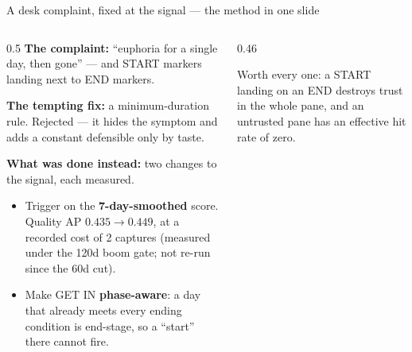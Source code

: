 \documentclass[aspectratio=169,11pt]{beamer}
\begin{document}
\begin{frame}{A desk complaint, fixed at the signal --- the method in one slide}
  \begin{columns}[T]
    \begin{column}{0.5\linewidth}
      \footnotesize
      \textbf{The complaint:} ``euphoria for a single day, then gone'' --- and
      START markers landing next to END markers.
      \vspace{0.3em}

      \textbf{The tempting fix:} a minimum-duration rule. Rejected --- it hides
      the symptom and adds a constant defensible only by taste.
      \vspace{0.3em}

      \textbf{What was done instead:} two changes to the signal, each measured.
      \begin{itemize}\scriptsize
        \item Trigger on the \textbf{7-day-smoothed} score. Quality
          AP $0.435 \rightarrow 0.449$, at a recorded cost of 2 captures
          (measured under the 120d boom gate; not re-run since the 60d cut).
        \item Make GET IN \textbf{phase-aware}: a day that already meets every
          ending condition is end-stage, so a ``start'' there cannot fire.
      \end{itemize}
    \end{column}
    \begin{column}{0.46\linewidth}
      \\[0.7em]
      \vspace{0.2em}

      {\scriptsize\color{gicgrey} Worth every one: a START landing on an END
       destroys trust in the whole pane, and an untrusted pane has an effective
       hit rate of zero.}
    \end{column}
  \end{columns}
\end{frame}
\end{document}
